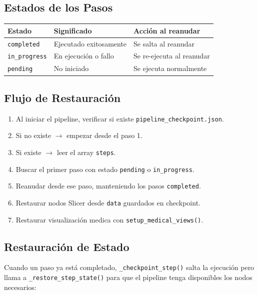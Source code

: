 \documentclass[12pt,a4paper]{article}
\begin{document}
\subsection{Estados de los Pasos}

\begin{table}[H]
\centering
\begin{tabular}{l l l}
\toprule
\textbf{Estado} & \textbf{Significado} & \textbf{Acción al reanudar} \\
\midrule
\texttt{completed} & Ejecutado exitosamente & Se salta al reanudar \\
\texttt{in\_progress} & En ejecución o fallo & Se re-ejecuta al reanudar \\
\texttt{pending} & No iniciado & Se ejecuta normalmente \\
\bottomrule
\end{tabular}
\end{table}

\subsection{Flujo de Restauración}

\begin{enumerate}
    \item Al iniciar el pipeline, verificar si existe \texttt{pipeline\_checkpoint.json}.
    \item Si no existe $\to$ empezar desde el paso 1.
    \item Si existe $\to$ leer el array \texttt{steps}.
    \item Buscar el primer paso con estado \texttt{pending} o \texttt{in\_progress}.
    \item Reanudar desde ese paso, manteniendo los pasos \texttt{completed}.
    \item Restaurar nodos Slicer desde \texttt{data} guardados en checkpoint.
    \item Restaurar visualización medica con \texttt{setup\_medical\_views()}.
\end{enumerate}

\subsection{Restauración de Estado}

Cuando un paso ya está completado, \texttt{\_checkpoint\_step()} salta la ejecución pero llama a
\texttt{\_restore\_step\_state()} para que el pipeline tenga disponibles los nodos necesarios:
\end{document}
